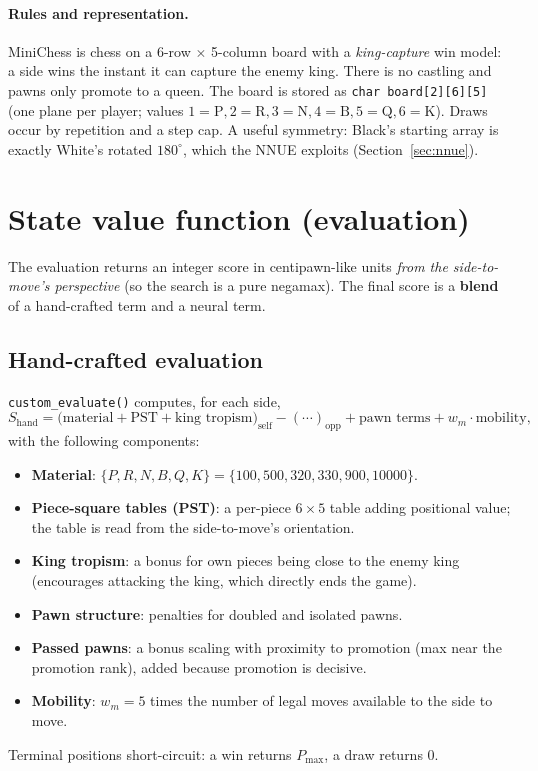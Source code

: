 \documentclass[11pt]{article}
\newcommand{\code}[1]{\texttt{#1}}
\begin{document}
\paragraph{Rules and representation.} MiniChess is chess on a 6-row $\times$
5-column board with a \emph{king-capture} win model: a side wins the instant it
can capture the enemy king. There is no castling and pawns only promote to a
queen. The board is stored as \code{char board[2][6][5]} (one plane per player;
values $1{=}\text{P},2{=}\text{R},3{=}\text{N},4{=}\text{B},5{=}\text{Q},6{=}\text{K}$).
Draws occur by repetition and a step cap. A useful symmetry: Black's starting
array is exactly White's rotated $180^\circ$, which the NNUE exploits
(Section~\ref{sec:nnue}).

\section{State value function (evaluation)}
The evaluation returns an integer score in centipawn-like units \emph{from the
side-to-move's perspective} (so the search is a pure negamax). The final score
is a \textbf{blend} of a hand-crafted term and a neural term.

\subsection{Hand-crafted evaluation}
\code{custom\_evaluate()} computes, for each side,
\begin{equation}
S_{\text{hand}} = \big(\text{material} + \text{PST} + \text{king tropism}\big)_{\text{self}}
  - (\cdots)_{\text{opp}} + \text{pawn terms} + w_m\cdot\text{mobility},
\end{equation}
with the following components:
\begin{itemize}[nosep]
  \item \textbf{Material}: $\{P,R,N,B,Q,K\}=\{100,500,320,330,900,10000\}$.
  \item \textbf{Piece-square tables (PST)}: a per-piece $6\times5$ table adding
        positional value; the table is read from the side-to-move's orientation.
  \item \textbf{King tropism}: a bonus for own pieces being close to the enemy
        king (encourages attacking the king, which directly ends the game).
  \item \textbf{Pawn structure}: penalties for doubled and isolated pawns.
  \item \textbf{Passed pawns}: a bonus scaling with proximity to promotion
        (max near the promotion rank), added because promotion is decisive.
  \item \textbf{Mobility}: $w_m=5$ times the number of legal moves available to
        the side to move.
\end{itemize}
Terminal positions short-circuit: a win returns $P_{\max}$, a draw returns $0$.
\end{document}
